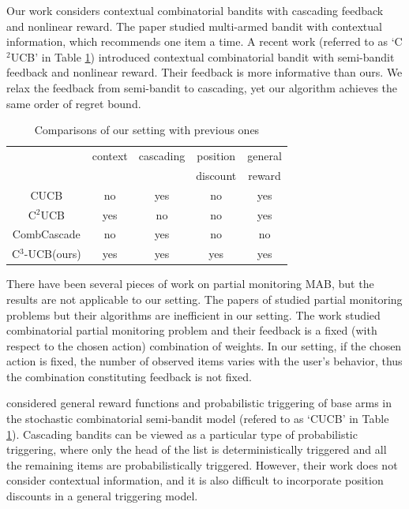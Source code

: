 \documentclass{article}
\begin{document}
Our work considers contextual combinatorial bandits with cascading feedback and nonlinear reward. The paper \cite{li2010contextual} studied multi-armed bandit with contextual information, which recommends one item a time. A recent work \cite{qin2014contextual} (referred to as `C$^2$UCB' in Table \ref{table:outline}) introduced contextual combinatorial bandit with semi-bandit feedback and nonlinear reward. Their feedback is more informative than ours. We relax the feedback from semi-bandit to cascading, yet our algorithm achieves the same order of regret bound.

\begin{table}
	\renewcommand{\arraystretch}{1.1}
	\centering
	\begin{tabular}{|c|c|c|c|c|}
		\hline
		&context &cascading &position  & general \\
		&         &          &discount & reward \\
		\hline
		CUCB &no &yes &no & yes \\
		\hline
		C$^2$UCB &yes &no &no & yes  \\
		\hline
		CombCascade	&no &yes &no  & no \\
		\hline
		C$^3$-UCB(ours) &yes &yes &yes & yes \\
		\hline
	\end{tabular}
	\caption{Comparisons of our setting with previous ones }
	\label{table:outline}
\end{table} 

There have been several pieces of work on partial monitoring MAB, but the results are not applicable to our setting. The papers of \cite{agrawal1989asymptotically,bartok2012adaptive} studied partial monitoring problems but their algorithms are inefficient in our setting. The work \cite{lin2014combinatorial} studied combinatorial partial monitoring problem and their feedback is a fixed (with respect to the chosen action) combination of weights. In our setting, if the chosen action is fixed, the number of observed items varies with the user's behavior, thus the combination constituting feedback is not fixed.

\citet{chen2015combinatorial} considered general reward functions and probabilistic triggering of base arms
	in the  stochastic combinatorial semi-bandit model (refered to as `CUCB' in Table \ref{table:outline}).
Cascading bandits can be viewed as a particular type of probabilistic triggering, where
	only the head of the list is deterministically triggered and all the remaining items are
	probabilistically triggered.
However, their work does not consider contextual information, and it is also difficult to
	incorporate position discounts in a general triggering model.
\end{document}
